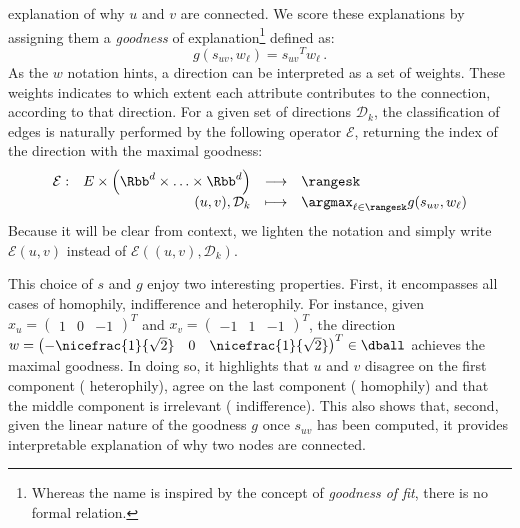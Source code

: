 \begin{enumerate}[1),nosep,leftmargin=*]
    explanation of why $u$ and $v$ are connected. We score these explanations by assigning them a
    \emph{goodness} of explanation\footnote{Whereas the name is inspired by the concept of
    \emph{goodness of fit}, there is no formal relation.} defined as:
    \begin{equation*}
      g(s_{uv}, w_\ell) = {s_{uv}}^T w_\ell \, .
    \end{equation*}
    As the $w$ notation hints, a direction can be interpreted as a set of weights. These weights
    indicates to which extent each attribute contributes to the connection, according to that
    direction. For a given set of directions $\mathcal{D}_k$, the classification of edges is
    naturally performed by the following operator $\mathcal{E}$, returning the index of the
    direction with the maximal goodness:
    \begin{equation*}
      \begin{array}[t]{lrcl}
        \mathcal{E} : & E \times \left( \Rbb^d \times \ldots \times \Rbb^d \right)
                      & \longrightarrow & \rangesk \\
                      & (u,v), \mathcal{D}_k & \longmapsto
                      & \argmax_{\ell \in \rangesk} g(s_{uv}, w_\ell)
      \end{array}
    \end{equation*}
    Because it will be clear from context, we lighten the notation and simply write $\mathcal{E}(u,
    v)$ instead of $\mathcal{E}\left((u, v), \mathcal{D}_k \right)$.
\end{enumerate}

This choice of $s$ and $g$ enjoy two interesting properties. First, it encompasses all cases of
homophily, indifference and heterophily. For instance, given $x_u = \begin{pmatrix} 1 & 0 & -1
\end{pmatrix}^T$ and $x_v = \begin{pmatrix} -1 & 1 & -1 \end{pmatrix}^T$, the direction $w =
\begin{pmatrix} -\nicefrac{1}{\sqrt{2}} & 0 & \nicefrac{1}{\sqrt{2}} \end{pmatrix}^T \in \dball$
achieves the maximal goodness. In doing so, it highlights that $u$ and $v$ disagree on the first
component (\ie{} heterophily), agree on the last component (\ie{} homophily) and that the middle
component is irrelevant (\ie{} indifference). This also shows that, second, given the linear nature
of the goodness $g$ once $s_{uv}$ has been computed, it provides interpretable explanation of why
two nodes are connected.

